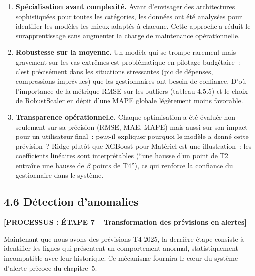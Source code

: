 \begin{enumerate}
    \item \textbf{Sp\'ecialisation avant complexit\'e.} Avant d'envisager des architectures sophistiqu\'ees
    pour toutes les cat\'egories, les donn\'ees ont \'et\'e analys\'ees pour identifier les
    mod\`eles les mieux adapt\'es \`a chacune. Cette approche a r\'eduit le surapprentissage
    sans augmenter la charge de maintenance op\'erationnelle.

    \item \textbf{Robustesse sur la moyenne.} Un mod\`ele qui se trompe rarement mais gravement
    sur les cas extr\^emes est probl\'ematique en pilotage budg\'etaire~: c'est pr\'ecis\'ement dans
    les situations stressantes (pic de d\'epenses, compressions impr\'evues) que les gestionnaires
    ont besoin de confiance. D'o\`u l'importance de la m\'etrique RMSE sur les outliers
    (tableau 4.5.5) et le choix de RobustScaler en d\'epit d'une MAPE globale l\'eg\`erement
    moins favorable.

    \item \textbf{Transparence op\'erationnelle.} Chaque optimisation a \'et\'e \'evalu\'ee non
    seulement sur sa pr\'ecision (RMSE, MAE, MAPE) mais aussi sur son impact pour un utilisateur
    final~: peut-il expliquer pourquoi le mod\`ele a donn\'e cette pr\'evision~? Ridge plutôt que
    XGBoost pour Mat\'eriel est une illustration~: les coefficients lin\'eaires sont interpr\'etables
    (``une hausse d'un point de T2 entra\^ine une hausse de $\beta$ points de T4''), ce qui renforce
    la confiance du gestionnaire dans le syst\`eme.
\end{enumerate}

\subsection*{4.6 \quad D\'etection d'anomalies}

\textbf{[PROCESSUS : \'ETAPE 7 -- Transformation des pr\'evisions en alertes]}

\noindent Maintenant que nous avons des pr\'evisions T4 2025, la derni\`ere \'etape
consiste \`a identifier les lignes qui pr\'esentent un comportement anormal,
statistiquement incompatible avec leur historique. Ce m\'ecanisme fournira le cœur
du syst\`eme d'alerte pr\'ecoce du chapitre~5.

